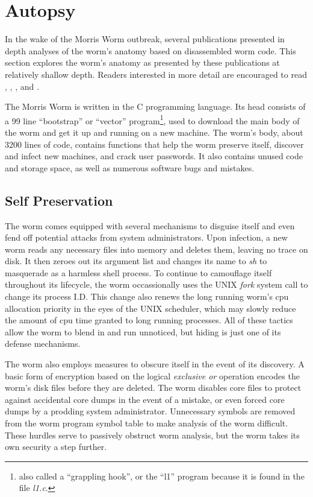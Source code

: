 \section*{Autopsy}
In the wake of the Morris Worm outbreak, several
publications presented in depth analyses of the worm's
anatomy based on disassembled worm code. This section explores the worm's
anatomy as presented by these publications at relatively shallow depth. Readers
interested in more detail are encouraged to read \cite{seeley_tour_1989},
\cite{spafford_crisis_1989},
\cite{spafford_internet_1989}, and
\cite{eichin_microscope_1989}.

The Morris Worm is written in the C programming language. Its head consists of a
99 line ``bootstrap'' or ``vector'' program\footnote{
also called a ``grappling hook'', or the ``l1'' program because it is found in 
the file \textit{l1.c}\cite{spafford_crisis_1989}.
}, used to download the main body of the worm and get it up
and running on a new machine. The worm's body, about 3200 lines of code,
contains functions that help the worm preserve itself, discover and infect
new machines, and crack user passwords. It also contains unused code
and storage space, as well as
numerous software bugs and mistakes.


\subsection*{Self Preservation}
The worm comes equipped with several mechanisms to disguise itself and even fend
off potential attacks from system administrators. Upon infection, a new worm
reads any necessary files into memory and deletes them, leaving no
trace on disk. It then zeroes out its argument list and changes its name to
\textit{sh} to masquerade as a harmless shell process. To continue to
camouflage itself throughout its lifecycle, the worm occassionally uses the
UNIX \textit{fork} system call to change its process I.D. This change also
renews the long running worm's cpu allocation priority in the eyes of the UNIX
scheduler, which may slowly reduce the amount of cpu time granted to long
running processes. All of these tactics allow the worm to blend in and run
unnoticed, but hiding is just one of its defense mechanisms.

The worm also employs measures to obscure itself in the event of its discovery.
A basic form of encryption based on the logical \textit{exclusive or} operation
encodes the worm's disk files before they are deleted. The worm disables core
files to protect against accidental core dumps in the event of a mistake, or
even forced core dumps by a prodding system administrator. Unnecessary symbols
are removed from the worm program symbol table to make analysis of the worm
difficult. These hurdles serve to passively obstruct worm analysis, but the worm
takes its own security a step further.

